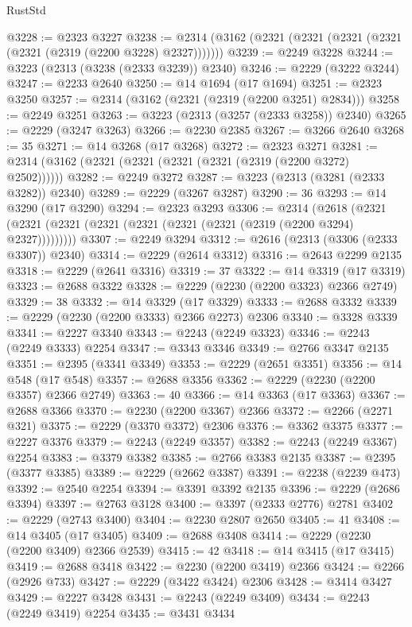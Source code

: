 \begin{lexlean}{RustStd}
\begin{coremodule}
@3228 := @2323 @3227
@3238 := @2314 (@3162 (@2321 (@2321 (@2321 (@2321 (@2321 (@2319 (@2200 @3228) @2327)))))))
@3239 := @2249 @3228
@3244 := @3223 (@2313 (@3238 (@2333 @3239)) @2340)
@3246 := @2229 (@3222 @3244)
@3247 := @2233 @2640
@3250 := @14 @1694 (@17 @1694)
@3251 := @2323 @3250
@3257 := @2314 (@3162 (@2321 (@2319 (@2200 @3251) @2834)))
@3258 := @2249 @3251
@3263 := @3223 (@2313 (@3257 (@2333 @3258)) @2340)
@3265 := @2229 (@3247 @3263)
@3266 := @2230 @2385
@3267 := @3266 @2640
@3268 := 35
@3271 := @14 @3268 (@17 @3268)
@3272 := @2323 @3271
@3281 := @2314 (@3162 (@2321 (@2321 (@2321 (@2321 (@2319 (@2200 @3272) @2502))))))
@3282 := @2249 @3272
@3287 := @3223 (@2313 (@3281 (@2333 @3282)) @2340)
@3289 := @2229 (@3267 @3287)
@3290 := 36
@3293 := @14 @3290 (@17 @3290)
@3294 := @2323 @3293
@3306 := @2314
    (@2618 (@2321 (@2321 (@2321 (@2321 (@2321 (@2321 (@2321 (@2319 (@2200 @3294) @2327)))))))))
@3307 := @2249 @3294
@3312 := @2616 (@2313 (@3306 (@2333 @3307)) @2340)
@3314 := @2229 (@2614 @3312)
@3316 := @2643 @2299 @2135
@3318 := @2229 (@2641 @3316)
@3319 := 37
@3322 := @14 @3319 (@17 @3319)
@3323 := @2688 @3322
@3328 := @2229 (@2230 (@2200 @3323) @2366 @2749)
@3329 := 38
@3332 := @14 @3329 (@17 @3329)
@3333 := @2688 @3332
@3339 := @2229 (@2230 (@2200 @3333) @2366 @2273) @2306
@3340 := @3328 @3339
@3341 := @2227 @3340
@3343 := @2243 (@2249 @3323)
@3346 := @2243 (@2249 @3333) @2254
@3347 := @3343 @3346
@3349 := @2766 @3347 @2135
@3351 := @2395 (@3341 @3349)
@3353 := @2229 (@2651 @3351)
@3356 := @14 @548 (@17 @548)
@3357 := @2688 @3356
@3362 := @2229 (@2230 (@2200 @3357) @2366 @2749)
@3363 := 40
@3366 := @14 @3363 (@17 @3363)
@3367 := @2688 @3366
@3370 := @2230 (@2200 @3367) @2366
@3372 := @2266 (@2271 @321)
@3375 := @2229 (@3370 @3372) @2306
@3376 := @3362 @3375
@3377 := @2227 @3376
@3379 := @2243 (@2249 @3357)
@3382 := @2243 (@2249 @3367) @2254
@3383 := @3379 @3382
@3385 := @2766 @3383 @2135
@3387 := @2395 (@3377 @3385)
@3389 := @2229 (@2662 @3387)
@3391 := @2238 (@2239 @473)
@3392 := @2540 @2254
@3394 := @3391 @3392 @2135
@3396 := @2229 (@2686 @3394)
@3397 := @2763 @3128
@3400 := @3397 (@2333 @2776) @2781
@3402 := @2229 (@2743 @3400)
@3404 := @2230 @2807 @2650
@3405 := 41
@3408 := @14 @3405 (@17 @3405)
@3409 := @2688 @3408
@3414 := @2229 (@2230 (@2200 @3409) @2366 @2539)
@3415 := 42
@3418 := @14 @3415 (@17 @3415)
@3419 := @2688 @3418
@3422 := @2230 (@2200 @3419) @2366
@3424 := @2266 (@2926 @733)
@3427 := @2229 (@3422 @3424) @2306
@3428 := @3414 @3427
@3429 := @2227 @3428
@3431 := @2243 (@2249 @3409)
@3434 := @2243 (@2249 @3419) @2254
@3435 := @3431 @3434

\end{coremodule}
\end{lexlean}
